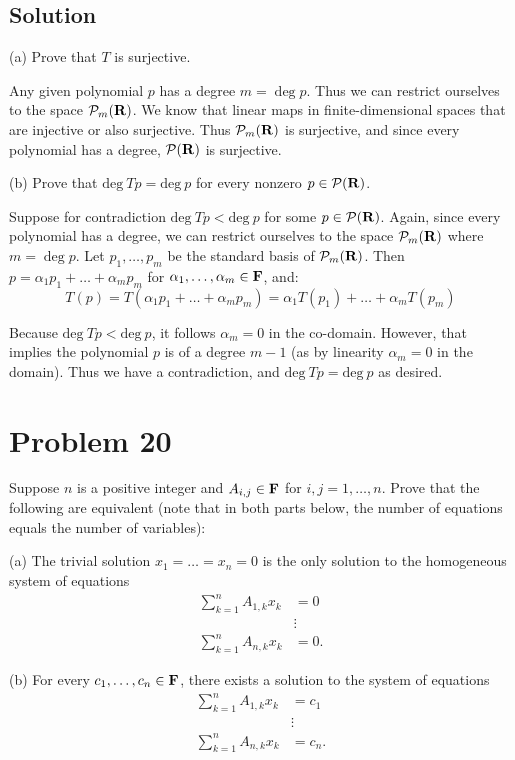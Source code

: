 \documentclass{article}
\begin{document}
\subsection*{Solution}
(a) Prove that $T$ is surjective.

Any given polynomial $p$ has a degree $m=\deg p$. Thus we can restrict ourselves to the space $\mathcal{P}_m(\mathbf{R})$. We know that linear maps in finite-dimensional spaces that are injective or also surjective. Thus $\mathcal{P}_m(\mathbf{R})$ is surjective, and since every polynomial has a degree, $\mathcal{P}(\mathbf{R})$ is surjective.

\vs

(b) Prove that $\text{deg}\ Tp=\text{deg}\ p$ for every nonzero $p\in\mathcal{P}(\mathbf{R})$.

Suppose for contradiction $\text{deg}\ Tp< \text{deg}\ p$ for some $p\in \mathcal{P}(\mathbf{R})$. Again, since every polynomial has a degree, we can restrict ourselves to the space $\mathcal{P}_m(\mathbf{R})$ where $m=\deg p$. Let $p_1,\ldots,p_m$ be the standard basis of $\mathcal{P}_m(\mathbf{R})$. Then $p=\alpha_1 p_1+\ldots+\alpha_m p_m$ for $\alpha_1,\ldots,\alpha_m\in\mathbf{F}$, and:
\[T(p)=T(\alpha_1 p_1+\ldots+\alpha_m p_m)=\alpha_1 T(p_1)+\ldots+ \alpha_m T(p_m)\]

Because $\text{deg}\ Tp< \text{deg}\ p$, it follows $\alpha_m=0$ in the co-domain. However, that implies the polynomial $p$ is of a degree $m-1$ (as by linearity $\alpha_m=0$ in the domain). Thus we have a contradiction, and $\text{deg}\ Tp = \text{deg}\ p$ as desired.

\section*{Problem 20}
Suppose $n$ is a positive integer and $A_{i,j}\in\mathbf{F}$ for $i,j=1,\ldots,n$. Prove that the following are equivalent (note that in both parts below, the number of equations equals the number of variables):

\vs

(a) The trivial solution $x_1=\ldots=x_n=0$ is the only solution to the homogeneous system of equations
\begin{align*}
\sum_{k=1}^{n} A_{1,k}x_k &= 0 \\
& \vdots \\
\sum_{k=1}^{n} A_{n,k}x_k &= 0.
\end{align*}

\vs

(b) For every $c_1,\ldots,c_n\in\mathbf{F}$, there exists a solution to the system of equations
\begin{align*}
\sum_{k=1}^{n} A_{1,k}x_k &= c_1 \\
& \vdots \\
\sum_{k=1}^{n} A_{n,k}x_k &= c_n.
\end{align*}
\end{document}
